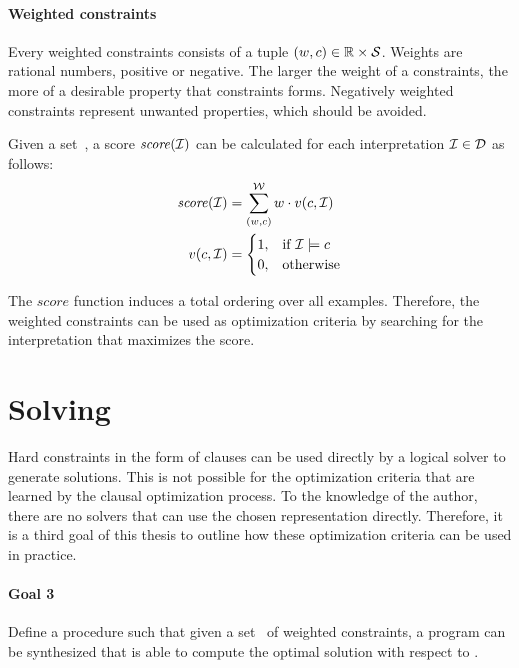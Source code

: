 \paragraph{Weighted constraints}
Every weighted constraints consists of a tuple $(w, c) \in \mathbb{R} \times \mathcal{S}$.
Weights are rational numbers, positive or negative.
The larger the weight of a constraints, the more of a desirable property that constraints forms.
Negatively weighted constraints represent unwanted properties, which should be avoided.

Given a set~, a score $\mathit{score}(\mathcal{I})$ can be calculated for each interpretation $\mathcal{I} \in \mathcal{D}$ as follows:
\begin{align*}
	\mathit{score}(\mathcal{I}) &= \sum\limits_{(w, c)}^{\mathcal{W}} w \cdot v(c, \mathcal{I}) \\
	v(c, \mathcal{I}) &=
	\begin{cases}
		1,& \text{if } \mathcal{I} \models c\\
		0,& \text{otherwise}
	\end{cases}
\end{align*}

The $\mathit{score}$ function induces a total ordering over all examples.
Therefore, the weighted constraints  can be used as optimization criteria by searching for the interpretation that maximizes the score.

\section{Solving}
Hard constraints in the form of clauses can be used directly by a logical solver to generate solutions.
This is not possible for the optimization criteria that are learned by the clausal optimization process.
To the knowledge of the author, there are no solvers that can use the chosen representation directly.
Therefore, it is a third goal of this thesis to outline how these optimization criteria can be used in practice.

\begin{framed}
	\noindent
	\begin{minipage}{\textwidth}
	\paragraph{Goal 3}
	Define a procedure such that given a set~ of weighted constraints, a program can be synthesized that is able to compute the optimal solution with respect to .
	\end{minipage}
\end{framed}
